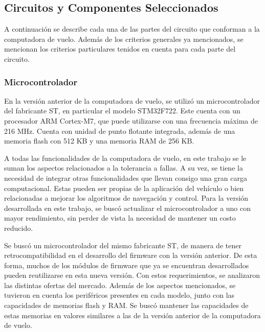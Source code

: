 \subsection{Circuitos y Componentes Seleccionados}

A continuación se describe cada una de las partes del circuito que conforman a la computadora de vuelo. Además de los criterios generales ya mencionados, se mencionan los criterios particulares tenidos en cuenta para cada parte del circuito.

\subsubsection{Microcontrolador}



En la versión anterior de la computadora de vuelo, se utilizó un microcontrolador del fabricante ST, en particular el modelo STM32F722. Este cuenta con un procesador ARM Cortex-M7, que puede utilizarse con una frecuencia máxima de 216 MHz. Cuenta con unidad de punto flotante integrada, además de una memoria flash con 512 KB y una memoria RAM de 256 KB.

A todas las funcionalidades de la computadora de vuelo, en este trabajo se le suman los aspectos relacionados a la tolerancia a fallas. A su vez, se tiene la necesidad de integrar otras funcionalidades que llevan consigo una gran carga computacional. Estas pueden ser propias de la aplicación del vehículo o bien relacionadas a mejorar los algoritmos de navegación y control. Para la versión desarrollada en este trabajo, se buscó actualizar el microcontrolador a uno con mayor rendimiento, sin perder de vista la necesidad de mantener un costo reducido.

Se buscó un microcontrolador del mismo fabricante ST, de manera de tener retrocompatibilidad en el desarrollo del firmware con la versión anterior. De esta forma, muchos de los módulos de firmware que ya se encuentran desarrollados pueden reutilizarse en esta nueva versión. Con estos requerimientos, se analizaron las distintas ofertas del mercado. Además de los aspectos mencionados, se tuvieron en cuenta los periféricos presentes en cada modelo, junto con las capacidades de memorias flash y RAM. Se buscó mantener las capacidades de estas memorias en valores similares a las de la versión anterior de la computadora de vuelo.

